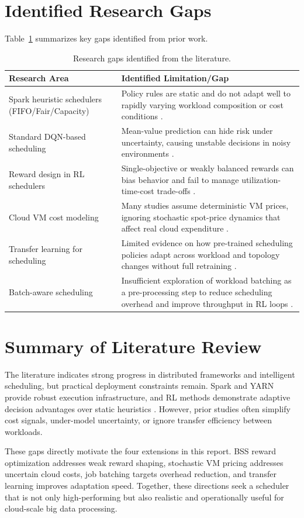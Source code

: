 \section{Identified Research Gaps}
Table~\ref{tab:research_gaps} summarizes key gaps identified from prior work.

\renewcommand{\arraystretch}{1.15}
\begin{table}[H]
\centering
\caption{Research gaps identified from the literature.}
\label{tab:research_gaps}
\begin{tabular}{|p{4.0cm}|p{10.0cm}|}
\hline
\textbf{Research Area} & \textbf{Identified Limitation/Gap} \\
\hline
Spark heuristic schedulers (FIFO/Fair/Capacity) & Policy rules are static and do not adapt well to rapidly varying workload composition or cost conditions \cite{schedsurvey2016}. \\
\hline
Standard DQN-based scheduling & Mean-value prediction can hide risk under uncertainty, causing unstable decisions in noisy environments \cite{bellemare2017distributional}. \\
\hline
Reward design in RL schedulers & Single-objective or weakly balanced rewards can bias behavior and fail to manage utilization-time-cost trade-offs \cite{sutton2018rl}. \\
\hline
Cloud VM cost modeling & Many studies assume deterministic VM prices, ignoring stochastic spot-price dynamics that affect real cloud expenditure \cite{spot2013deconstructing}. \\
\hline
Transfer learning for scheduling & Limited evidence on how pre-trained scheduling policies adapt across workload and topology changes without full retraining \cite{taylor2009transfer}. \\
\hline
Batch-aware scheduling & Insufficient exploration of workload batching as a pre-processing step to reduce scheduling overhead and improve throughput in RL loops \cite{mao2016resource}. \\
\hline
\end{tabular}
\end{table}

\section{Summary of Literature Review}
The literature indicates strong progress in distributed frameworks and intelligent scheduling, but practical deployment constraints remain. Spark and YARN provide robust execution infrastructure, and RL methods demonstrate adaptive decision advantages over static heuristics \cite{zaharia2016spark,vavilapalli2013apache,mao2016resource}. However, prior studies often simplify cost signals, under-model uncertainty, or ignore transfer efficiency between workloads.

These gaps directly motivate the four extensions in this report. BSS reward optimization addresses weak reward shaping, stochastic VM pricing addresses uncertain cloud costs, job batching targets overhead reduction, and transfer learning improves adaptation speed. Together, these directions seek a scheduler that is not only high-performing but also realistic and operationally useful for cloud-scale big data processing.
